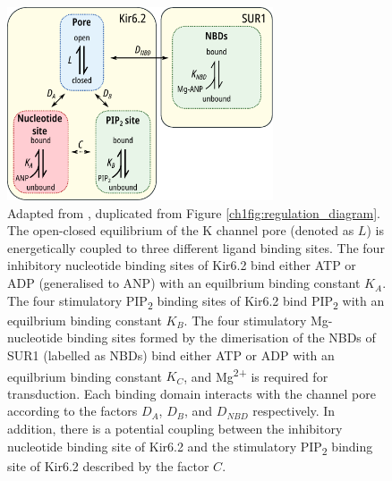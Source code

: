 \begin{figure}[hbtp]
	\centering
	\includegraphics[width=0.7\textwidth]{regulation_diagram.pdf}
	\caption[Modes of regulation of K\ATP{} - reprinted]{
	{\bf{}}
	Adapted from \cite{puljung_cryo-electron_2018}, duplicated from Figure \ref{ch1fig:regulation_diagram}.
	The open-closed equilibrium of the K\ATP{} channel pore (denoted as $L$) is energetically coupled to three different ligand binding sites.
	The four inhibitory nucleotide binding sites of Kir6.2 bind either ATP or ADP (generalised to ANP) with an equilbrium binding constant $K_A$.
	The four stimulatory PIP\textsubscript{2} binding sites of Kir6.2 bind PIP\textsubscript{2} with an equilbrium binding constant $K_B$.
	The four stimulatory Mg-nucleotide binding sites formed by the dimerisation of the NBDs of SUR1 (labelled as NBDs) bind either ATP or ADP with an equilbrium binding constant $K_C$, and Mg\textsuperscript{2+} is required for transduction.
	Each binding domain interacts with the channel pore according to the factors $D_A$, $D_B$, and $D_{NBD}$ respectively.
	In addition, there is a potential coupling between the inhibitory nucleotide binding site of Kir6.2 and the stimulatory PIP\textsubscript{2} binding site of Kir6.2 described by the factor $C$.
	}\label{ch7fig:regulation_diagram}
\end{figure}

